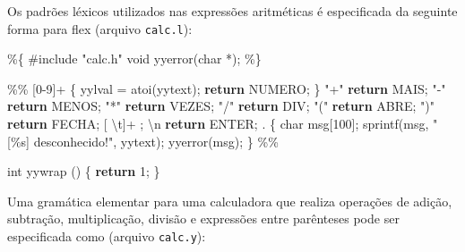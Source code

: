\documentclass[
  brazilian,
  letterpaper,
]{book}
\newenvironment{Shaded}{\begin{snugshade}}{\end{snugshade}}
\newcommand{\ControlFlowTok}[1]{\textcolor[rgb]{0.00,0.23,0.31}{\textbf{#1}}}
\newcommand{\DataTypeTok}[1]{\textcolor[rgb]{0.68,0.00,0.00}{#1}}
\newcommand{\DecValTok}[1]{\textcolor[rgb]{0.68,0.00,0.00}{#1}}
\newcommand{\ImportTok}[1]{\textcolor[rgb]{0.00,0.46,0.62}{#1}}
\newcommand{\NormalTok}[1]{\textcolor[rgb]{0.00,0.23,0.31}{#1}}
\newcommand{\OperatorTok}[1]{\textcolor[rgb]{0.37,0.37,0.37}{#1}}
\newcommand{\PreprocessorTok}[1]{\textcolor[rgb]{0.68,0.00,0.00}{#1}}
\newcommand{\SpecialCharTok}[1]{\textcolor[rgb]{0.37,0.37,0.37}{#1}}
\newcommand{\StringTok}[1]{\textcolor[rgb]{0.13,0.47,0.30}{#1}}
\theoremstyle{plain}
\theoremstyle{definition}
\theoremstyle{remark}
\begin{document}
Os padrões léxicos utilizados nas expressões aritméticas é especificada
da seguinte forma para flex (arquivo \texttt{calc.l}):

\begin{Shaded}
\begin{Highlighting}[]
\OperatorTok{\%\{}
\PreprocessorTok{\#include }\ImportTok{"calc.h"}
\DataTypeTok{void}\NormalTok{ yyerror}\OperatorTok{(}\DataTypeTok{char} \OperatorTok{*);}
\OperatorTok{\%\}}

\OperatorTok{\%\%}
\OperatorTok{[}\DecValTok{0}\OperatorTok{{-}}\DecValTok{9}\OperatorTok{]+}     \OperatorTok{\{}  
\NormalTok{              yylval }\OperatorTok{=}\NormalTok{ atoi}\OperatorTok{(}\NormalTok{yytext}\OperatorTok{);}
              \ControlFlowTok{return}\NormalTok{ NUMERO}\OperatorTok{;}
           \OperatorTok{\}}
\StringTok{"+"}        \ControlFlowTok{return}\NormalTok{ MAIS}\OperatorTok{;}
\StringTok{"{-}"}        \ControlFlowTok{return}\NormalTok{ MENOS}\OperatorTok{;}
\StringTok{"*"}        \ControlFlowTok{return}\NormalTok{ VEZES}\OperatorTok{;}
\StringTok{"/"}        \ControlFlowTok{return}\NormalTok{ DIV}\OperatorTok{;}
\StringTok{"("}        \ControlFlowTok{return}\NormalTok{ ABRE}\OperatorTok{;}
\StringTok{")"}        \ControlFlowTok{return}\NormalTok{ FECHA}\OperatorTok{;}
\OperatorTok{[}\NormalTok{ \textbackslash{}t}\OperatorTok{]+}     \OperatorTok{;}
\NormalTok{\textbackslash{}n         }\ControlFlowTok{return}\NormalTok{ ENTER}\OperatorTok{;}
\OperatorTok{.}          \OperatorTok{\{}
             \DataTypeTok{char}\NormalTok{ msg}\OperatorTok{[}\DecValTok{100}\OperatorTok{];}
\NormalTok{             sprintf}\OperatorTok{(}\NormalTok{msg}\OperatorTok{,} \StringTok{"[}\SpecialCharTok{\%s}\StringTok{] desconhecido!"}\OperatorTok{,}\NormalTok{ yytext}\OperatorTok{);}
\NormalTok{             yyerror}\OperatorTok{(}\NormalTok{msg}\OperatorTok{);}
           \OperatorTok{\}}
\OperatorTok{\%\%}

\DataTypeTok{int}\NormalTok{ yywrap }\OperatorTok{()} \OperatorTok{\{}
    \ControlFlowTok{return} \DecValTok{1}\OperatorTok{;}
\OperatorTok{\}}
\end{Highlighting}
\end{Shaded}

Uma gramática elementar para uma calculadora que realiza operações de
adição, subtração, multiplicação, divisão e expressões entre parênteses
pode ser especificada como (arquivo \texttt{calc.y}):
\end{document}
